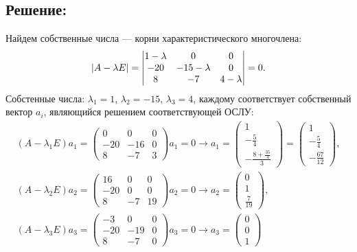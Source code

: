 \documentclass[12pt]{article}
\begin{document}
    \subsection*{Решение:}
    Найдем собственные числа --- корни характеристического многочлена:
    \[
        \left | A - \lambda E \right |
        = \begin{vmatrix}
              1 - \lambda & 0             & 0           \\
              -20         & -15 - \lambda & 0           \\
              8           & -7            & 4 - \lambda
        \end{vmatrix}
        = 0 .
    \]
    Собстенные числа: $\lambda_1 = 1$, $\lambda_2 = -15$, $\lambda_3 = 4$, каждому соответствует собственный вектор $a_i$, являющийся решением
    соответствующей ОСЛУ:
    \begin{gather*}
        \left ( A - \lambda_1 E \right ) a_1
        = \begin{pmatrix}
              0   & 0   & 0 \\
              -20 & -16 & 0 \\
              8   & -7  & 3
        \end{pmatrix}
        a_1 = 0
        \rightarrow
        a_1
        = \begin{pmatrix}
              1 \\ - \frac{5}{4} \\ - \frac{8 + \frac{35}{4}}{3}
        \end{pmatrix}
        = \begin{pmatrix}
              1 \\ - \frac{5}{4} \\ - \frac{67}{12}
        \end{pmatrix} , \\
        \left ( A - \lambda_2 E \right ) a_2
        = \begin{pmatrix}
              16  & 0  & 0  \\
              -20 & 0  & 0  \\
              8   & -7 & 19
        \end{pmatrix}
        a_2 = 0
        \rightarrow
        a_2
        = \begin{pmatrix}
              0 \\ 1 \\ \frac{7}{19}
        \end{pmatrix} , \\
        \left ( A - \lambda_3 E \right ) a_3
        = \begin{pmatrix}
              -3  & 0   & 0 \\
              -20 & -19 & 0 \\
              8   & -7  & 0
        \end{pmatrix}
        a_3 = 0
        \rightarrow
        a_3
        = \begin{pmatrix}
              0 \\ 0 \\ 1
        \end{pmatrix}
    \end{gather*}
\end{document}
